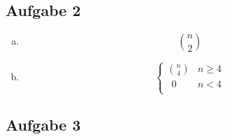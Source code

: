 \subsection*{Aufgabe 2}
\begin{enumerate}[a)]
\item \[\binom{n}{2}\]
\item \[\begin{cases} \binom{n}{4} & n\geq 4 \\
              \; \, 0 & n < 4  \\
              \end{cases} \]

\end{enumerate}


\subsection*{Aufgabe 3} %
\label{sub:aufgabe_3}
